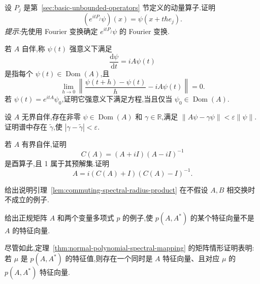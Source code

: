 \begin{exercise}[动量生成的平移群]\label{ex:momentum-generates-translations}
设 \(P_{j}\) 是第~\ref{sec:basic-unbounded-operators} 节定义的动量算子.证明
\[
(e^{itP_{j}}\psi)(x)=\psi(x+t\hbar e_{j}).
\]
\emph{提示:}先使用 Fourier 变换确定 \(e^{itP_{j}}\psi\) 的 Fourier 变换.
\end{exercise}

\begin{exercise}\label{ex:strong-schrodinger-equation}
若 \(A\) 自伴,称 \(\psi(t)\) 强意义下满足
\[
\frac{\mathrm{d}\psi}{\mathrm{d}t}=iA\psi(t)
\]
是指每个 \(\psi(t)\in\operatorname{Dom}(A)\),且
\[
\lim_{h\to0}\left\|\frac{\psi(t+h)-\psi(t)}{h}-iA\psi(t)\right\|=0.
\]
若 \(\psi(t)=e^{itA}\psi_{0}\),证明它强意义下满足方程,当且仅当 \(\psi_{0}\in\operatorname{Dom}(A)\).
\end{exercise}

\begin{exercise}[无界自伴算子的近似特征值]\label{ex:unbounded-almost-eigenvalue}
设 \(A\) 无界自伴,存在非零 \(\psi\in\operatorname{Dom}(A)\) 和 \(\gamma\in\mathbb{R}\),满足 \(\|A\psi-\gamma\psi\|<\varepsilon\|\psi\|\).证明谱中存在 \(\widetilde\gamma\),使 \(|\gamma-\widetilde\gamma|<\varepsilon\).
\end{exercise}

\begin{exercise}\label{ex:bounded-cayley}
若 \(A\) 有界自伴,证明
\[
C(A)=(A+iI)(A-iI)^{-1}
\]
是酉算子,且 1 属于其预解集.证明
\[
A=i(C(A)+I)(C(A)-I)^{-1}.
\]
\end{exercise}

\begin{exercise}[不交换乘积的谱半径]\label{ex:noncommuting-spectral-radius}
给出说明引理~\ref{lem:commuting-spectral-radius-product} 在不假设 \(A,B\) 相交换时不成立的例子.
\end{exercise}

\begin{exercise}[正规矩阵的多项式特征向量]\label{ex:normal-polynomial-eigenvector}
给出正规矩阵 \(A\) 和两个变量多项式 \(p\) 的例子,使 \(p(A,A^{*})\) 的某个特征向量不是 \(A\) 的特征向量.
\begin{note}
尽管如此,定理~\ref{thm:normal-polynomial-spectral-mapping} 的矩阵情形证明表明:若 \(\mu\) 是 \(p(A,A^{*})\) 的特征值,则存在一个同时是 \(A\) 特征向量、且对应 \(\mu\) 的 \(p(A,A^{*})\) 特征向量.
\end{note}
\end{exercise}

